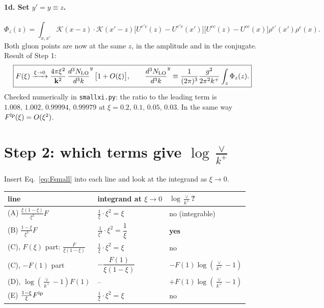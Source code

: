 \documentclass[10pt]{article}
\numberwithin{equation}{section}
\newcommand{\NLO}[1]{\frac{d^3N_{#1}}{d^3k}}
\begin{document}
\paragraph{1d. Set $y'=y\equiv z$.}
\begin{equation}
\Phi_z(z)=\int_{x,x'}\mathcal K(x-z)\cdot\mathcal K(x'-z)\big[U^{e'c}(z)-U^{e'c}(x')\big]\big[U^{ec}(z)-U^{ce}(x)\big]\rho^{e'}(x')\rho^{e}(x).
\end{equation}
Both gluon points are now at the same $z$, in the amplitude and in the conjugate. Result of Step 1:
\begin{equation}
\boxed{F(\xi)\xrightarrow{\xi\to0}\frac{4\pi\xi^2}{\mathbf k^2}\,\NLO{\rm LO}^{y}\,\big[1+O(\xi)\big],\qquad
\NLO{\rm LO}^{y}\equiv\frac{1}{(2\pi)^{3}}\frac{g^{2}}{2\pi^{2}k^{+}}\int_z\Phi_z(z).}\label{eq:Fsmall}
\end{equation}
Checked numerically in \texttt{smallxi.py}: the ratio to the leading term is $1.008,\,1.002,\,0.99994,\,0.99979$ at $\xi=0.2,\,0.1,\,0.05,\,0.03$. In the same way $F^{\rm lp}(\xi)=O(\xi^2)$.

\section{Step 2: which terms give $\log\frac{\vee}{k^+}$}
Insert Eq.~\eqref{eq:Fsmall} into each line and look at the integrand as $\xi\to0$.
\begin{center}
\renewcommand{\arraystretch}{1.7}
\begin{tabular}{@{}lll@{}}\toprule
line & integrand at $\xi\to0$ & $\log\frac{\vee}{k^+}$?\\\midrule
(A) $\frac{\xi(1-\xi)}{\xi^2}F$ & $\frac1\xi\cdot\xi^2=\xi$ & no (integrable)\\
(B) $\frac{1-\xi}{\xi^3}F$ & $\frac{1}{\xi^3}\cdot\xi^2=\dfrac{1}{\xi}$ & \textbf{yes}\\
(C), $F(\xi)$ part: $\frac{F}{\xi(1-\xi)}$ & $\frac1\xi\cdot\xi^2=\xi$ & no\\
(C), $-F(1)$ part & $-\dfrac{F(1)}{\xi(1-\xi)}$ & $-F(1)\log(\frac{\vee}{k^+}-1)$\\
(D), $\log(\frac{\vee}{k^+}-1)F(1)$ & -- & $+F(1)\log(\frac{\vee}{k^+}-1)$\\
(E) $\frac{1-\xi}{\xi}F^{\rm lp}$ & $\frac1\xi\cdot\xi^2=\xi$ & no\\\bottomrule
\end{tabular}
\end{center}
\end{document}
